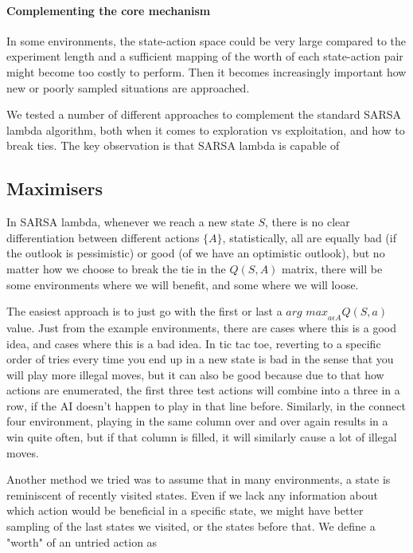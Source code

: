 \paragraph{Complementing the core mechanism}
In some environments, the state-action space could be very large compared to the experiment length and a sufficient mapping of the worth of each state-action pair might become too costly to perform. Then it becomes increasingly important how new or poorly sampled situations are approached.

We tested a number of different approaches to complement the standard SARSA lambda algorithm, both when it comes to exploration vs exploitation, and how to break ties. The key observation is that SARSA lambda is capable of 

\subsection{Maximisers}

In SARSA lambda, whenever we reach a new state $S$, there is no clear differentiation between different actions $\{A\}$, statistically, all are equally bad (if the outlook is pessimistic) or good (of we have an optimistic outlook), but no matter how we choose to break the tie in the $Q(S,A)$ matrix, there will be some environments where we will benefit, and some where we will loose.

The easiest approach is to just go with the first or last a $\textit{arg max}_{a\epsilon A} Q(S,a)$ value. Just from the example environments, there are cases where this is a good idea, and cases where this is a bad idea. In tic tac toe, reverting to a specific order of tries every time you end up in a new state is bad in the sense that you will play more illegal moves, but it can also be good because due to that how actions are enumerated, the first three test actions will combine into a three in a row, if the AI doesn't happen to play in that line before. Similarly, in the connect four environment, playing in the same column over and over again results in a win quite often, but if that column is filled, it will similarly cause a lot of illegal moves.

Another method we tried was to assume that in many environments, a state is reminiscent of recently visited states. Even if we lack any information about which action would be beneficial in a specific state, we might have better sampling of the last states we visited, or the states before that. We define a  "worth" of an untried action as

